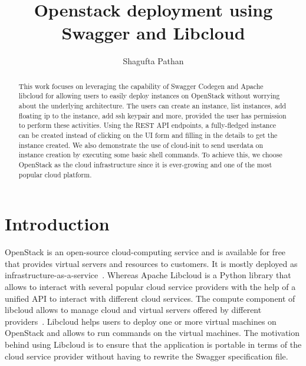
\title{Openstack deployment using Swagger and Libcloud}

\author{Shagufta Pathan}

\renewcommand{\shortauthors}{Shagufta}

\begin{abstract}
This work focuses on leveraging the capability of Swagger Codegen and Apache 
libcloud for allowing users to easily deploy instances on OpenStack without 
worrying about the underlying architecture. The users can create an instance, 
list instances, add floating ip to the instance, add ssh keypair and more, 
provided the user has permission to perform these activities. Using the REST 
API endpoints, a fully-fledged instance can be created instead of clicking on 
the UI form and filling in the details to get the instance created. We also 
demonstrate the use of cloud-init to send userdata on instance creation by 
executing some basic shell commands. To achieve this, we choose OpenStack as 
the cloud infrastructure since it is ever-growing and one of the most popular 
cloud platform.
\end{abstract}


\maketitle
\section{Introduction}
OpenStack is an open-source cloud-computing service and is available for free
that provides virtual servers and resources to customers. It is mostly 
deployed as infrastructure-as-a-service~\cite{hid-sp18-516-www-openstack}. 
Whereas Apache Libcloud is a Python library that allows to interact with 
several popular cloud service providers with the help of a unified API to 
interact with different cloud services. The compute component of libcloud 
allows to manage cloud and virtual servers offered by different 
providers~\cite{hid-sp18-516-www-libcloud}. Libcloud helps users to deploy one 
or more virtual machines on OpenStack and allows to run commands on the 
virtual machines. The motivation behind using Libcloud is to ensure that the 
application is portable in terms of the cloud service provider without having 
to rewrite the Swagger specification file.

